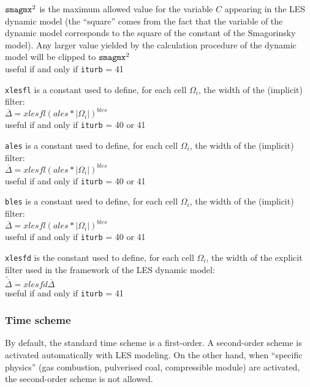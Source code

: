 {${\tt smagmx}^2$ is
the maximum allowed value for the variable $C$ appearing in the LES dynamic
model (the ``square'' comes from the fact that the
variable of the dynamic model corresponds to the square of the
constant of the Smagorinsky model). Any larger value yielded by the calculation
procedure of the dynamic model will be clipped to ${\tt smagmx}^2$\\
useful if and only if {\tt iturb} = 41}

{{\tt xlesfl} is a constant used to define, for
each cell $\Omega_i$, the width of the (implicit) filter:\\
$\overline{\Delta}=xlesfl(ales*|\Omega_i|)^{bles}$\\
useful if and only if {\tt iturb} = 40 or 41}

{{\tt ales} is a constant used to define, for
each cell $\Omega_i$, the width of the (implicit) filter:\\
$\overline{\Delta}=xlesfl(ales*|\Omega_i|)^{bles}$\\
useful if and only if {\tt iturb} = 40 or 41}

{{\tt bles} is a constant used to define, for
each cell $\Omega_i$, the width of the (implicit) filter:\\
$\overline{\Delta}=xlesfl(ales*|\Omega_i|)^{bles}$\\
useful if and only if {\tt iturb} = 40 or 41}

{{\tt xlesfd} is the constant used to define, for
each cell $\Omega_i$, the width of the explicit filter used in the framework of
the LES dynamic model:\\
$\widetilde{\overline{\Delta}}=xlesfd\overline{\Delta}$\\
useful if and only if {\tt iturb} = 41}



\subsubsection{Time scheme}

By default, the standard time scheme is a first-order.
A second-order scheme is activated automatically with LES modeling.
On the other hand, when ``specific physics'' (gas combustion, pulverised coal,
compressible module) are activated, the second-order scheme is not allowed.

